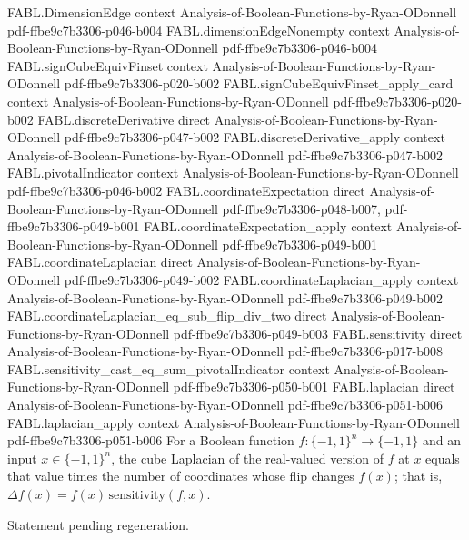 \begin{theorem}
\proofstep
  {FABL.DimensionEdge}
  {context}
  {Analysis-of-Boolean-Functions-by-Ryan-ODonnell}
  {pdf-ffbe9c7b3306-p046-b004}
\proofstep
  {FABL.dimensionEdgeNonempty}
  {context}
  {Analysis-of-Boolean-Functions-by-Ryan-ODonnell}
  {pdf-ffbe9c7b3306-p046-b004}
\proofstep
  {FABL.signCubeEquivFinset}
  {context}
  {Analysis-of-Boolean-Functions-by-Ryan-ODonnell}
  {pdf-ffbe9c7b3306-p020-b002}
\proofstep
  {FABL.signCubeEquivFinset_apply_card}
  {context}
  {Analysis-of-Boolean-Functions-by-Ryan-ODonnell}
  {pdf-ffbe9c7b3306-p020-b002}
\proofstep
  {FABL.discreteDerivative}
  {direct}
  {Analysis-of-Boolean-Functions-by-Ryan-ODonnell}
  {pdf-ffbe9c7b3306-p047-b002}
\proofstep
  {FABL.discreteDerivative_apply}
  {context}
  {Analysis-of-Boolean-Functions-by-Ryan-ODonnell}
  {pdf-ffbe9c7b3306-p047-b002}
\proofstep
  {FABL.pivotalIndicator}
  {context}
  {Analysis-of-Boolean-Functions-by-Ryan-ODonnell}
  {pdf-ffbe9c7b3306-p046-b002}
\proofstep
  {FABL.coordinateExpectation}
  {direct}
  {Analysis-of-Boolean-Functions-by-Ryan-ODonnell}
  {pdf-ffbe9c7b3306-p048-b007,
    pdf-ffbe9c7b3306-p049-b001}
\proofstep
  {FABL.coordinateExpectation_apply}
  {context}
  {Analysis-of-Boolean-Functions-by-Ryan-ODonnell}
  {pdf-ffbe9c7b3306-p049-b001}
\proofstep
  {FABL.coordinateLaplacian}
  {direct}
  {Analysis-of-Boolean-Functions-by-Ryan-ODonnell}
  {pdf-ffbe9c7b3306-p049-b002}
\proofstep
  {FABL.coordinateLaplacian_apply}
  {context}
  {Analysis-of-Boolean-Functions-by-Ryan-ODonnell}
  {pdf-ffbe9c7b3306-p049-b002}
\proofstep
  {FABL.coordinateLaplacian_eq_sub_flip_div_two}
  {direct}
  {Analysis-of-Boolean-Functions-by-Ryan-ODonnell}
  {pdf-ffbe9c7b3306-p049-b003}
\proofstep
  {FABL.sensitivity}
  {direct}
  {Analysis-of-Boolean-Functions-by-Ryan-ODonnell}
  {pdf-ffbe9c7b3306-p017-b008}
\proofstep
  {FABL.sensitivity_cast_eq_sum_pivotalIndicator}
  {context}
  {Analysis-of-Boolean-Functions-by-Ryan-ODonnell}
  {pdf-ffbe9c7b3306-p050-b001}
\proofstep
  {FABL.laplacian}
  {direct}
  {Analysis-of-Boolean-Functions-by-Ryan-ODonnell}
  {pdf-ffbe9c7b3306-p051-b006}
\proofstep
  {FABL.laplacian_apply}
  {context}
  {Analysis-of-Boolean-Functions-by-Ryan-ODonnell}
  {pdf-ffbe9c7b3306-p051-b006}
For a Boolean function $f:\{−1,1\}^n\to\{−1,1\}$ and an input $x\in\{−1,1\}^n$, the cube
Laplacian of the real-valued version of $f$ at $x$ equals that value times the number of
coordinates whose flip changes $f(x)$; that is, $\Delta
f(x)=f(x)\,\mathrm{sensitivity}(f,x)$.
\end{theorem}

\begin{theorem}
\label{FABL.laplacian_eq_fourier_sum}
\leanok
{}
Statement pending regeneration.
\end{theorem}

